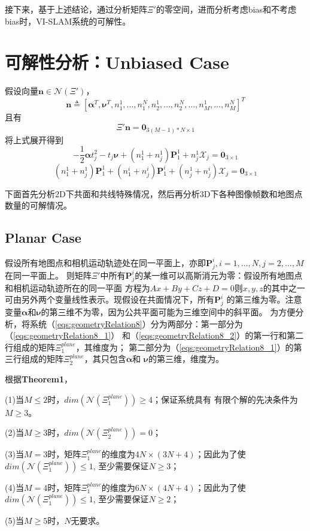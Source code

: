 \documentclass{article}
\begin{document}
\par
接下来，基于上述结论，通过分析矩阵$\Xi'$的零空间，进而分析考虑bias和不考虑bias时，VI-SLAM系统的可解性。

\section{可解性分析：Unbiased Case}
假设向量$\textbf{n}\in\mathcal{N}(\Xi')$，
\begin{equation}
    \textbf{n}\triangleq \left[\mathbf{\alpha}^T,\mathbf{\nu}^T,n_1^1,\dots,n_1^N,
    n_2^1,\dots,n_2^N,\dots,n_M^1,\dots,n_M^N\right]^T
\end{equation}
且有
\begin{equation}\label{eqs:geometryRelation8}
    \Xi'\textbf{n}=\textbf{0}_{3(M-1)*N\times 1}
\end{equation}
将上式展开得到
\begin{equation}\label{eqs:geometryRelation8_1}
    -\frac{1}{2}\mathbf{\alpha}t_j^2-t_j\mathbf{\nu}+(n_1^1+n_j^1)\textbf{P}_1^1+n_j^1\mathcal{X}_j=\textbf{0}_{3\times 1}
\end{equation}
\begin{equation}\label{eqs:geometryRelation8_2}
    (n_1^1+n_j^1)\textbf{P}_1^1+(n_1^i+n_j^i)\textbf{P}_1^i+(n_j^1+n_j^i)\mathcal{X}_j=\textbf{0}_{3\times 1}
\end{equation}

下面首先分析2D下共面和共线特殊情况，然后再分析3D下各种图像帧数和地图点数量的可解情况。
\subsection{Planar Case}
假设所有地图点和相机运动轨迹处在同一平面上，亦即$\textbf{P}_j^i,i=1,\dots,N,j=2,\dots,M$在同一平面上。
则矩阵$\Xi'$中所有$\textbf{P}_j^i$的某一维可以高斯消元为零：假设所有地图点和相机运动轨迹所在的同一平面
方程为$Ax+By+Cz+D=0$则$x,y,z$的其中之一可由另外两个变量线性表示。现假设在共面情况下，所有$\textbf{P}_j^i$
的第三维为零。注意变量$\mathbf{\alpha}$和$\mathbf{\nu}$的第三维不为零，因为公共平面可能为三维空间中的斜平面。
为方便分析，将系统（\ref{eqs:geometryRelation8}）分为两部分：第一部分为（\ref{eqs:geometryRelation8_1}）
和（\ref{eqs:geometryRelation8_2}）的第一行和第二行组成的矩阵$\Xi_1^{plane}$，其维度为{\color{red}{$2(M-1)N\times (MN+4)$}}；
第二部分为（\ref{eqs:geometryRelation8_1}）的第三行组成的矩阵$\Xi_2^{plane}$，其只包含$\mathbf{\alpha}$和
$\mathbf{\nu}$的第三维，维度为{\color{red}{$(M-1)\times 2$}}。
\par
根据\textbf{Theorem1}，
\par
(1)当$M\leqslant 2$时，$dim(\mathcal{N}(\Xi_1^{plane}))\geqslant 4$；保证系统具有
有限个解的先决条件为$M\geqslant 3$。
\par
(2)当$M\geqslant 3$时，$dim(\mathcal{N}(\Xi_2^{plane}))=0$；
\par
(3)当$M=3$时，矩阵$\Xi_1^{plane}$的维度为$4N\times (3N+4)$；因此为了使$dim(\mathcal{N}(\Xi_1^{plane}))\leqslant 1$,
至少需要保证$N\geqslant 3$；
\par
(4)当$M=4$时，矩阵$\Xi_1^{plane}$的维度为$6N\times (4N+4)$；因此为了使$dim(\mathcal{N}(\Xi_1^{plane}))\leqslant 1$,
至少需要保证$N\geqslant 2$；
\par
(5)当$M\geqslant 5$时，$N$无要求。
\end{document}
